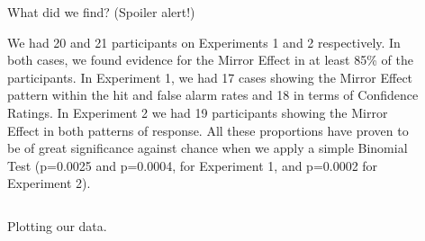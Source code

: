 \documentclass[final]{beamer}
\newlength{\sepwid}
\newlength{\onecolwid}
\newlength{\twocolwid}
\begin{document}
\begin{frame}[t]
\begin{columns}[t]
\begin{column}{\onecolwid}

\end{column} %

\begin{column}{\sepwid}\end{column} %

\begin{column}{\twocolwid} %



\begin{alertblock}{What did we find? (Spoiler alert!)}

We had 20 and 21 participants on Experiments 1 and 2 respectively. In both cases, we found evidence for the Mirror Effect in at least 85\% of the participants. In Experiment 1, we had 17 cases showing the Mirror Effect pattern within the hit and false alarm rates and 18 in terms of Confidence Ratings. In Experiment 2 we had 19 participants showing the Mirror Effect in both patterns of response. All these proportions have proven to be of great significance against chance when we apply a simple Binomial Test (p=0.0025 and p=0.0004, for Experiment 1, and p=0.0002 for Experiment 2).

\end{alertblock} 

\setlength{\onecolwid}{0.24\paperwidth}
\begin{columns}[t,totalwidth=\twocolwid] %
\begin{column}{\onecolwid}\vspace{-.6in} %


\begin{alertblock}{Plotting our data.}



\end{alertblock}
\end{column}
\end{columns}
\end{column}
\end{columns}
\end{frame}
\end{document}
